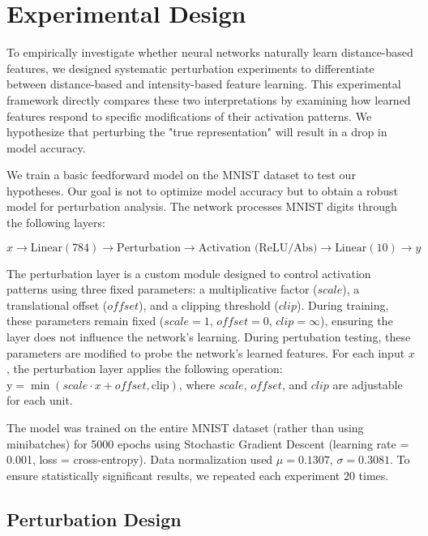 \section{Experimental Design}

To empirically investigate whether neural networks naturally learn distance-based features, we designed systematic perturbation experiments to differentiate between distance-based and intensity-based feature learning. This experimental framework directly compares these two interpretations by examining how learned features respond to specific modifications of their activation patterns. We hypothesize that perturbing the "true representation" will result in a drop in model accuracy. 

We train a basic feedforward model on the MNIST dataset to test our hypotheses. Our goal is not to optimize model accuracy but to obtain a robust model for perturbation analysis. The network processes MNIST digits through the following layers:

\begin{equation}
    x \rightarrow \text{Linear}(784) \rightarrow \text{Perturbation} \rightarrow \text{Activation (ReLU/Abs)} \rightarrow \text{Linear}(10) \rightarrow y
\end{equation}
 
The perturbation layer is a custom module designed to control activation patterns using three fixed parameters: a multiplicative factor ($scale$), a translational offset ($offset$), and a clipping threshold ($clip$). During training, these parameters remain fixed ($scale = 1$, $offset = 0$, $clip = \infty$), ensuring the layer does not influence the network's learning. During pertubation testing, these parameters are modified to probe the network's learned features. For each input $x$, the perturbation layer applies the following operation: $\text{y} = \min(scale \cdot x + offset, \text{clip})$, where $scale$, $offset$, and $clip$ are adjustable for each unit.

The model was trained on the entire MNIST dataset (rather than using minibatches) for 5000 epochs using Stochastic Gradient Descent (learning rate = 0.001, loss = cross-entropy). Data normalization used $\mu=0.1307$, $\sigma=0.3081$. To ensure statistically significant results, we repeated each experiment 20 times.

\subsection{Perturbation Design}

